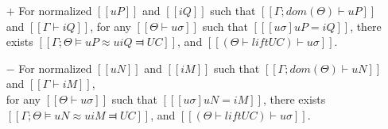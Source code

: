 \begin{lemma} \label{lemma:unification-completeness}
    \hfill
    \begin{itemize}
        \item [$+$] For normalized $[[uP]]$ and $[[iQ]]$ such that
        $[[Γ ; dom(Θ) ⊢  uP]]$ and $[[Γ ⊢ iQ]]$, 
        for any $[[Θ ⊢ uσ]]$ such that $[[ [uσ]uP = iQ ]]$,
        there exists $[[Γ ; Θ ⊨ uP ≈u iQ ⫤ UC]]$,
        and $[[(Θ  ⊢  lift UC) ⊢ uσ]]$.
        
        \item [$-$] For normalized $[[uN]]$ and $[[iM]]$ such that
        $[[Γ ; dom(Θ) ⊢  uN]]$ and $[[Γ ⊢ iM]]$,\\
        for any $[[Θ ⊢ uσ]]$ such that $[[ [uσ]uN = iM ]]$,
        there exists $[[Γ ; Θ ⊨ uN ≈u iM ⫤ UC]]$,
        and $[[(Θ  ⊢  lift UC) ⊢ uσ]]$.
   \end{itemize}
\end{lemma}
